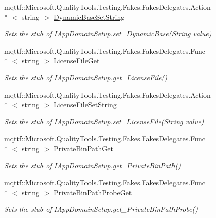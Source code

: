 \begin{DoxyCompactItemize}
mqttf\-::\-Microsoft.\-Quality\-Tools.\-Testing.\-Fakes.\-Fakes\-Delegates.\-Action\\*
$<$ string $>$ \hyperlink{class_system_1_1_fakes_1_1_stub_i_app_domain_setup_a07cc0a44b5b04e6ffeeed3f80c2bdc84}{Dynamic\-Base\-Set\-String}
\begin{DoxyCompactList}\small\item\em Sets the stub of I\-App\-Domain\-Setup.\-set\-\_\-\-Dynamic\-Base(\-String value)\end{DoxyCompactList}\item 
mqttf\-::\-Microsoft.\-Quality\-Tools.\-Testing.\-Fakes.\-Fakes\-Delegates.\-Func\\*
$<$ string $>$ \hyperlink{class_system_1_1_fakes_1_1_stub_i_app_domain_setup_a96f5abf9c4f12dfed01d8b61d42b3ffa}{License\-File\-Get}
\begin{DoxyCompactList}\small\item\em Sets the stub of I\-App\-Domain\-Setup.\-get\-\_\-\-License\-File()\end{DoxyCompactList}\item 
mqttf\-::\-Microsoft.\-Quality\-Tools.\-Testing.\-Fakes.\-Fakes\-Delegates.\-Action\\*
$<$ string $>$ \hyperlink{class_system_1_1_fakes_1_1_stub_i_app_domain_setup_ab4a4d30a65ccf9572bf2513506dc393c}{License\-File\-Set\-String}
\begin{DoxyCompactList}\small\item\em Sets the stub of I\-App\-Domain\-Setup.\-set\-\_\-\-License\-File(\-String value)\end{DoxyCompactList}\item 
mqttf\-::\-Microsoft.\-Quality\-Tools.\-Testing.\-Fakes.\-Fakes\-Delegates.\-Func\\*
$<$ string $>$ \hyperlink{class_system_1_1_fakes_1_1_stub_i_app_domain_setup_a2651fb7e7582691d09f2840c18e1d14c}{Private\-Bin\-Path\-Get}
\begin{DoxyCompactList}\small\item\em Sets the stub of I\-App\-Domain\-Setup.\-get\-\_\-\-Private\-Bin\-Path()\end{DoxyCompactList}\item 
mqttf\-::\-Microsoft.\-Quality\-Tools.\-Testing.\-Fakes.\-Fakes\-Delegates.\-Func\\*
$<$ string $>$ \hyperlink{class_system_1_1_fakes_1_1_stub_i_app_domain_setup_a79beaf83c594de66e9837725e0e403fd}{Private\-Bin\-Path\-Probe\-Get}
\begin{DoxyCompactList}\small\item\em Sets the stub of I\-App\-Domain\-Setup.\-get\-\_\-\-Private\-Bin\-Path\-Probe()\end{DoxyCompactList}\item 

\end{DoxyCompactItemize}
